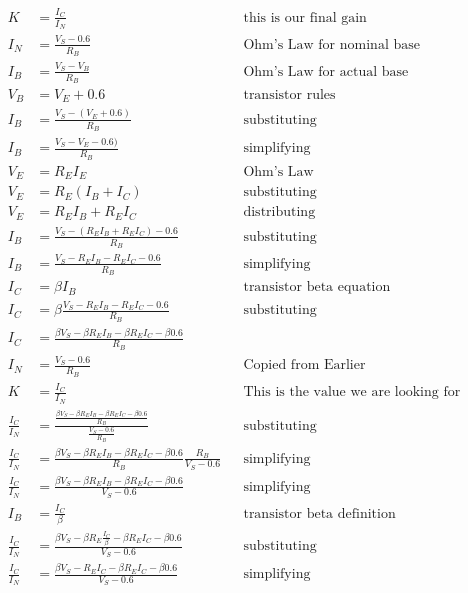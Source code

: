 \begin{align*}
K &= \frac{I_C}{I_N} && \textrm{this is our final gain} \\
I_N &= \frac{V_S - 0.6}{R_B} && \textrm{Ohm's Law for nominal base} \\
I_B &= \frac{V_S - V_B}{R_B} && \textrm{Ohm's Law for actual base} \\
V_B &= V_E + 0.6 && \textrm{transistor rules} \\
I_B &= \frac{V_S - (V_E + 0.6)}{R_B} && \textrm{substituting} \\
I_B &= \frac{V_S - V_E - 0.6)}{R_B} && \textrm{simplifying} \\
V_E &= R_E I_E && \textrm{Ohm's Law} \\
V_E &= R_E(I_B + I_C) && \textrm{substituting} \\
V_E &=  R_E I_B + R_E I_C && \textrm{distributing} \\
I_B &= \frac{V_S - (R_E I_B + R_E I_C) - 0.6}{R_B} && \textrm{substituting} \\
I_B &= \frac{V_S - R_E I_B - R_E I_C - 0.6}{R_B} && \textrm{simplifying} \\
I_C &= \beta I_B && \textrm{transistor beta equation} \\
I_C &= \beta \frac{V_S - R_E I_B - R_E I_C - 0.6}{R_B} && \textrm{substituting} \\
I_C &= \frac{\beta V_S - \beta R_E I_B - \beta R_E I_C - \beta 0.6}{R_B} \\
I_N &= \frac{V_S - 0.6}{R_B} && \textrm{Copied from Earlier} \\
K &= \frac{I_C}{I_N} && \textrm{This is the value we are looking for} \\
\frac{I_C}{I_N} &= \frac{\frac{\beta V_S - \beta R_E I_B - \beta R_E I_C - \beta 0.6}{R_B}}{\frac{V_S - 0.6}{R_B}} && \textrm{substituting} \\
\frac{I_C}{I_N} &= \frac{\beta V_S - \beta R_E I_B - \beta R_E I_C - \beta 0.6}{R_B} \frac{R_B}{V_S - 0.6} && \textrm{simplifying} \\
\frac{I_C}{I_N} &= \frac{\beta V_S - \beta R_E I_B - \beta R_E I_C - \beta 0.6}{V_S - 0.6} && \textrm{simplifying} \\
I_B &= \frac{I_C}{\beta} && \textrm{transistor beta definition} \\
\frac{I_C}{I_N} &= \frac{\beta V_S - \beta R_E \frac{I_C}{\beta} - \beta R_E I_C - \beta 0.6}{V_S - 0.6} && \textrm{substituting} \\
\frac{I_C}{I_N} &= \frac{\beta V_S - R_E I_C - \beta R_E I_C - \beta 0.6}{V_S - 0.6} && \textrm{simplifying} \\
\end{align*}
